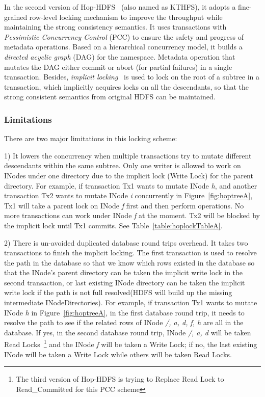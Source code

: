 \documentclass[runningheads,a4paper]{llncs}
\begin{document}
In the second version of Hop-HDFS~\cite{peiro2013maintaining} (also named as KTHFS), it adopts a fine-grained row-level locking mechanism to improve the throughput while maintaining the strong consistency semantics. It uses transactions with \textit{Pessimistic Concurrency Control} (PCC) to ensure the safety and progress of metadata operations. Based on a hierarchical concurrency model, it builds a \textit{directed acyclic graph} (DAG) for the namespace. Metadata operation that mutates the DAG either commit or abort (for partial failures) in a single transaction. Besides, \textit{implicit locking}~\cite{gray1976granularity} is used to lock on the root of a subtree in a transaction, which implicitly acquires locks on all the descendants, so that the strong consistent semantics from original HDFS can be maintained.

\subsubsection{Limitations}

There are two major limitations in this locking scheme:

1) It lowers the concurrency when multiple transactions try to mutate different descendants within the same subtree. Only one writer is allowed to work on INodes under one directory due to the implicit lock (Write Lock) for the parent directory. For example, if transaction Tx1 wants to mutate INode \textit{h}, and another transaction Tx2 wants to mutate INode \textit{i} concurrently in Figure~\ref{fig:hoptreeA}, Tx1 will take a parent lock on INode \textit{f} first and then perform operations. No more transactions can work under INode \textit{f} at the moment. Tx2 will be blocked by the implicit lock until Tx1 commits. See Table~\ref{table:hoplockTableA}.

2) There is un-avoided duplicated database round trips overhead. It takes two transactions to finish the implicit locking. The first transaction is used to resolve the path in the database so that we know which rows existed in the database so that the INode's parent directory can be taken the implicit write lock in the second transaction, or last existing INode directory can be taken the implicit write lock if the path is not full resolved(HDFS will build up the missing intermediate INodeDirectories). For example, if transaction Tx1 wants to mutate INode \textit{h} in Figure~\ref{fig:hoptreeA}, in the first database round trip, it needs to resolve the path to see if the related rows of INode\textit{ /, a, d, f, h} are all in the database. If yes, in the second database round trip, INode\textit{ /, a, d} will be taken Read Locks~\footnote{The third version of Hop-HDFS is trying to Replace Read Lock to Read\_Committed for this PCC scheme} and the INode \textit{f} will be taken a Write Lock; if no, the last existing INode will be taken a Write Lock while others will be taken Read Locks.
\end{document}
